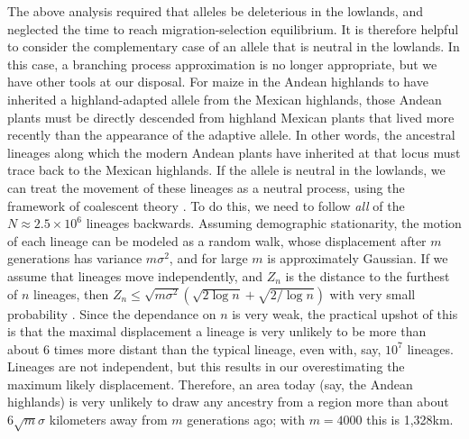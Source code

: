 The above analysis required that alleles be deleterious in the lowlands, 
and neglected the time to reach migration-selection equilibrium.
It is therefore helpful to consider the complementary case of an allele that is neutral in the lowlands.
In this case, a branching process approximation is no longer appropriate,
but we have other tools at our disposal.
For maize in the Andean highlands to have inherited a highland-adapted allele from the Mexican highlands, 
those Andean plants must be directly descended from highland Mexican plants that lived more recently than the appearance of the adaptive allele.
In other words, the ancestral lineages along which the modern Andean plants have inherited at that locus must trace back to the Mexican highlands.
If the allele is neutral in the lowlands, we can treat the movement of these lineages as a neutral process, using the framework of coalescent theory 
\citep{wakeley2005coalescent}.
To do this, we need to follow \emph{all} of the $N \approx 2.5 \times 10^6$ lineages backwards.
Assuming demographic stationarity,
the motion of each lineage can be modeled as a random walk,
whose displacement after $m$ generations has variance $m \sigma^2$, and for large $m$ is approximately Gaussian.
If we assume that lineages move independently, 
and $Z_n$ is the distance to the furthest of $n$ lineages, 
then $Z_n \le \sqrt{m \sigma^2} ( \sqrt{2 \log n} + \sqrt{2/\log n} )$ with very small probability
\citep{berman1964limit}. 
Since the dependance on $n$ is very weak,
the practical upshot of this is that the maximal displacement a lineage is very unlikely to be more than about 6 times more distant 
than the typical lineage,
even with, say, $10^7$ lineages.
Lineages are not independent, but this results in our overestimating the maximum likely displacement.
Therefore, an area today (say, the Andean highlands)
is very unlikely to draw any ancestry from a region more than about $6 \sqrt{m} \sigma$ kilometers away from $m$ generations ago;
with $m=4000$ this is 1,328km.




